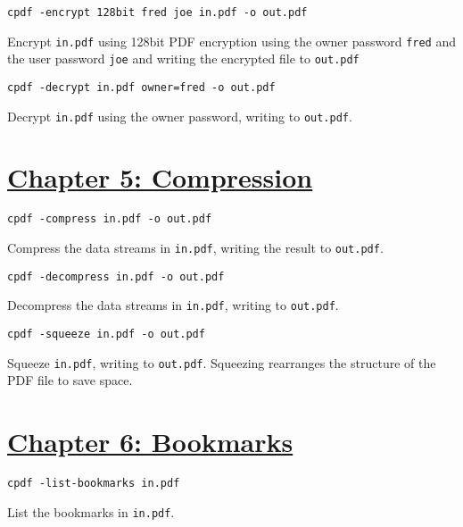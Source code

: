 \documentclass{book}
\begin{document}
\begin{framed}\noindent\texttt{cpdf -encrypt 128bit fred joe in.pdf -o out.pdf}\end{framed}

\noindent Encrypt \texttt{in.pdf} using 128bit PDF encryption using the owner password \texttt{fred} and the user password \texttt{joe} and writing the encrypted file to \texttt{out.pdf}

\begin{framed}\noindent\texttt{cpdf -decrypt in.pdf owner=fred -o out.pdf}\end{framed}

\noindent Decrypt \texttt{in.pdf} using the owner password, writing to \texttt{out.pdf}.


\section*{\hyperref[chap:5]{Chapter 5: Compression}}

\begin{framed}\noindent\texttt{cpdf -compress in.pdf -o out.pdf}\end{framed}

\noindent Compress the data streams in \texttt{in.pdf}, writing the result to \texttt{out.pdf}.

\begin{framed}\noindent\texttt{cpdf -decompress in.pdf -o out.pdf}\end{framed}

\noindent Decompress the data streams in \texttt{in.pdf}, writing to \texttt{out.pdf}.

\begin{framed}\noindent\texttt{cpdf -squeeze in.pdf -o out.pdf}\end{framed}

\noindent Squeeze \texttt{in.pdf}, writing to \texttt{out.pdf}. Squeezing rearranges the structure of the PDF file to save space.


\section*{\hyperref[chap:6]{Chapter 6: Bookmarks}}

\begin{framed}\noindent\texttt{cpdf -list-bookmarks in.pdf}\end{framed}

\noindent List the bookmarks in \texttt{in.pdf}. 
\end{document}
